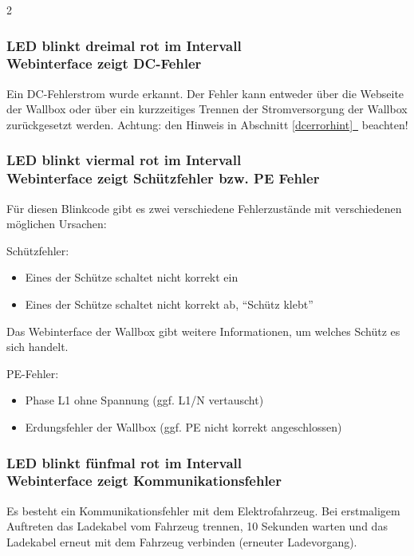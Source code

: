 \documentclass[a4paper,10pt]{article}
\newcommand*{\fullref}[1]{Abschnitt \hyperref[{#1}]{\ref*{#1}~\nameref*{#1}}}
\begin{document}
\begin{multicols*}{2}
    \begin{minipage}{\linewidth} %
        \subsubsection*{LED blinkt dreimal rot im Intervall \\ Webinterface zeigt DC-Fehler}
		Ein DC-Fehlerstrom wurde erkannt. Der Fehler kann entweder über die Webseite der Wallbox oder über
        ein kurzzeitiges Trennen der Stromversorgung der Wallbox zurückgesetzt
        werden. Achtung: den Hinweis in \fullref{dcerrorhint} beachten!
    \end{minipage}

    \subsubsection*{LED blinkt viermal rot im Intervall \\ Webinterface zeigt Schützfehler bzw. PE Fehler}
    Für diesen Blinkcode gibt es zwei verschiedene Fehlerzustände mit
	verschiedenen möglichen Ursachen:

	Schützfehler:
	    \begin{itemize}
        \item Eines der Schütze schaltet nicht korrekt ein
        \item Eines der Schütze schaltet nicht korrekt ab, \enquote{Schütz klebt}
    \end{itemize}
	Das Webinterface der Wallbox gibt weitere Informationen, um welches Schütz es
	sich handelt.

	PE-Fehler:
    \begin{itemize}
        \item Phase L1 ohne Spannung (ggf. L1/N vertauscht)
        \item Erdungsfehler der Wallbox (ggf. PE nicht korrekt angeschlossen)
    \end{itemize}

    \subsubsection*{LED blinkt fünfmal rot im Intervall \\ Webinterface zeigt Kommunikationsfehler}
    Es besteht ein Kommunikationsfehler mit dem Elektrofahrzeug. Bei erstmaligem
    Auftreten das Ladekabel vom Fahrzeug trennen, 10 Sekunden warten und das
    Ladekabel erneut mit dem Fahrzeug verbinden (erneuter Ladevorgang).


\end{multicols*}
\end{document}
